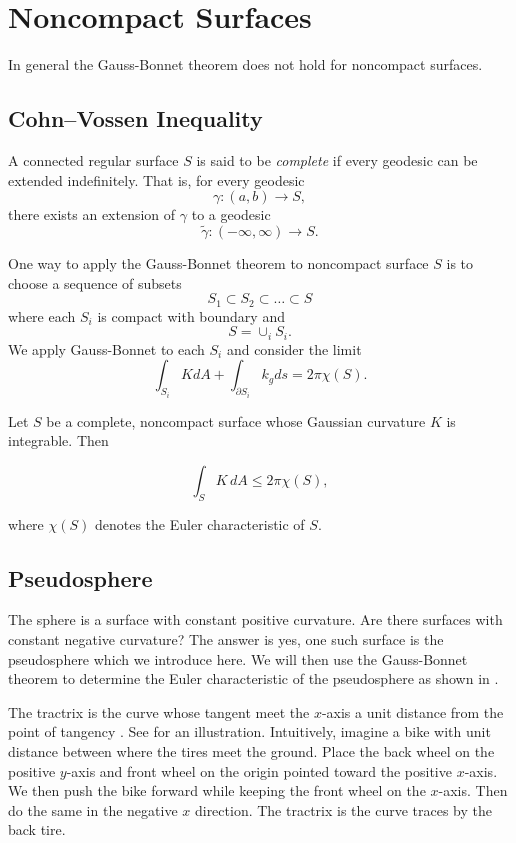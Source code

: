 \section{Noncompact Surfaces}

In general the Gauss-Bonnet theorem does not hold for noncompact
surfaces.



\subsection{Cohn--Vossen Inequality}

\begin{definition}
A connected regular surface $S$ is said to be \emph{complete} if every geodesic
can be extended indefinitely. That is, for every geodesic
$$\gamma:(a,b)\to S,$$
there exists an extension of $\gamma$ to a geodesic
$$\widetilde{\gamma}:(-\infty,\infty)\to S.$$
\end{definition}

One way to apply the Gauss-Bonnet theorem to noncompact surface $S$
is to choose a sequence of subsets
$$S_1\subset S_2\subset \ldots \subset S$$
where each $S_i$ is compact with boundary and
$$S=\cup_iS_i.$$
We apply Gauss-Bonnet to each $S_i$ and consider the limit
$$\int_{S_i}KdA+\int_{\partial S_i}k_g ds=2\pi \chi(S).$$


\begin{theorem}
Let $S$ be a complete, noncompact surface whose Gaussian curvature $K$
is integrable. Then

$$
\int_S K\,dA \leq 2\pi \chi(S),
$$

where $\chi(S)$ denotes the Euler characteristic of $S$.
\end{theorem}

\subsection{Pseudosphere}
\label{sec:pseudosphere}

The sphere is a surface with constant positive curvature.
Are there surfaces with constant negative curvature?
The answer is yes, one such surface is the pseudosphere
which we introduce here. We will then use the Gauss-Bonnet
theorem to determine the Euler characteristic of the pseudosphere as
shown in \cite{pseudo-app}.


The tractrix is the curve whose tangent meet the $x$-axis a unit distance
from the point of tangency \cite{thurston}. See  for an illustration.
Intuitively, imagine a bike with unit distance between where the tires meet the ground.
Place the back wheel on the positive $y$-axis and front wheel on the origin pointed
toward the positive $x$-axis. We then push the bike forward while keeping the front
wheel on the $x$-axis. Then do the same in the negative $x$ direction.
The tractrix is the curve traces by the back tire. 


